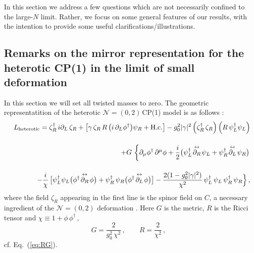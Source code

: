 \documentclass[epsfig,12pt]{article}
\def\beq{\begin{equation}}
\def\eeq{\end{equation}}
\def\beqn{\begin{eqnarray}}
\def\eeqn{\end{eqnarray}}
\newcommand{\nzt}{${\mathcal N}=(0,2)\,$}
\def\beqn{\begin{eqnarray}}
\def\eeqn{\end{eqnarray}}
\def\beq{\begin{equation}}
\def\eeq{\end{equation}}
\begin{document}
{In this section we  address a few questions which are not necessarily confined to the large-$N$ limit.
Rather, we focus on some general features of our results, with the intention to provide
some useful clarifications/illustrations.

\subsection{Remarks on the mirror representation
for the heterotic CP(1) in the limit of small deformation}


In this section we will set all twisted masses to zero.
The geometric representatition of  the heterotic \nzt CP(1) model is as follows \cite{SY1}:
\beqn
&&
L_{{\rm heterotic}}= 
\zeta_R^\dagger \, i\partial_L \, \zeta_R  + 
\left[\gamma \, \zeta_R  \,R\,  \big( i\,\partial_{L}\phi^{\dagger} \big)\psi_R
+{\rm H.c.}\right] -g_0^2|\gamma |^2 \left(\zeta_R^\dagger\, \zeta_R
\right)\left(R\,  \psi_L^\dagger\psi_L\right)
\nonumber
\\[4mm]
&&
+
G\, \left\{\rule{0mm}{5mm}
\partial_\mu \phi^\dagger\, \partial^\mu\phi  
+\frac{i}{2}\big(\psi_L^\dagger\!\stackrel{\leftrightarrow}{\partial_R}\!\psi_L 
+ \psi_R^\dagger\!\stackrel{\leftrightarrow}{\partial_L}\!\psi_R
\big)\right.
\nonumber
\\[4mm] 
&&
-\frac{i}{\chi}\,  \big[\psi_L^\dagger \psi_L
\big(\phi^\dagger \!\stackrel{\leftrightarrow}{\partial_R}\!\phi
\big)+ \psi_R^\dagger\, \psi_R
\big(\phi^\dagger\!\stackrel{\leftrightarrow}{\partial_L}\!\phi
\big)
\big]
-
\frac{2(1- g_0^2 |\gamma |^2)}{\chi^2}\,\psi_L^\dagger\,\psi_L \,\psi_R^\dagger\,\psi_R
\Big\}\,,
\label{AAone}
\eeqn
where the field $\zeta_R$ appearing in the first line is
the spinor field on $C$, a  necessary ingredient  of the ${\mathcal N}=(0,2)$ deformation
\cite{EdTo}.
Here $G$ is the metric, $R$ is the Ricci tensor and $\chi \equiv 1+\phi\,\phi^\dagger\,,$
\beq
G=
\frac{2}{g_{0}^2\,\chi^{2}}\,,\qquad R =\frac{2}{\chi^2}\,,
\label{fsmetrone}
\eeq
cf. Eq.~(\ref{eq:RG}).

}
\end{document}
